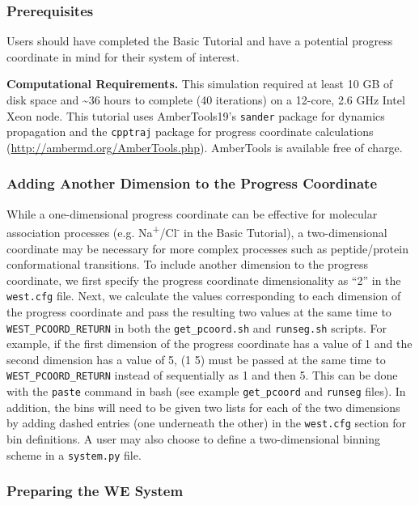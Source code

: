 \documentclass[9pt,tutorial,ASAPversion]{livecoms}
\begin{document}
\subsubsection{Prerequisites}

Users should have completed the Basic Tutorial and have a potential progress coordinate in mind for their system of interest. 

\textbf{Computational Requirements.} This simulation required at least 10 GB of disk space and \textasciitilde 36 hours to complete (40 iterations) on a 12-core, 2.6 GHz Intel Xeon node.
This tutorial uses AmberTools19’s \verb|sander| package for dynamics propagation and the  \verb|cpptraj| package for progress coordinate calculations (\url{http://ambermd.org/AmberTools.php}).  
AmberTools is available free of charge.

\subsubsection{Adding Another Dimension to the Progress Coordinate}

While a one-dimensional progress coordinate can be effective for molecular association processes (e.g. Na\textsuperscript{+}/Cl\textsuperscript{-} in the Basic Tutorial), a two-dimensional coordinate may be necessary for more complex processes such as peptide/protein conformational transitions. 
To include another dimension to the progress coordinate, we first specify the progress coordinate dimensionality as “2” in the \verb|west.cfg| file. 
Next, we calculate the values corresponding to each dimension of the progress coordinate and pass the resulting two values at the same time to \verb|WEST_PCOORD_RETURN| in both the \verb|get_pcoord.sh| and \verb|runseg.sh| scripts. 
For example, if the first dimension of the progress coordinate has a value of 1 and the second dimension has a value of 5, (1 5) must be passed at the same time to \verb|WEST_PCOORD_RETURN| instead of sequentially as 1 and then 5. 
This can be done with the \verb|paste| command in bash (see example \verb|get_pcoord| and \verb|runseg| files). 
In addition, the bins will need to be given two lists for each of the two dimensions by adding dashed entries (one underneath the other) in the \verb|west.cfg| section for bin definitions. 
A user may also choose to define a two-dimensional binning scheme in a \verb|system.py| file.

\subsubsection{Preparing the WE System}
\end{document}
